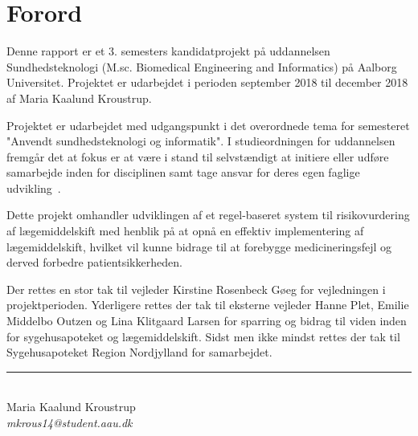 \chapter*{Forord}
Denne rapport er et 3. semesters kandidatprojekt på uddannelsen Sundhedsteknologi (M.sc. Biomedical Engineering and Informatics) på Aalborg Universitet. Projektet er udarbejdet i perioden september 2018 til december 2018 af Maria Kaalund Kroustrup. 

Projektet er udarbejdet med udgangspunkt i det overordnede tema for semesteret "Anvendt sundhedsteknologi og informatik". I studieordningen for uddannelsen fremgår det at fokus er at være i stand til selvstændigt at initiere eller udføre samarbejde inden for disciplinen samt tage ansvar for deres egen faglige udvikling~\citep{Studieordning2011}. 

Dette projekt omhandler udviklingen af et regel-baseret system til risikovurdering af lægemiddelskift med henblik på at opnå en effektiv implementering af lægemiddelskift, hvilket vil kunne bidrage til at forebygge medicineringsfejl og derved forbedre patientsikkerheden. 

Der rettes en stor tak til vejleder Kirstine Rosenbeck Gøeg for vejledningen i projektperioden. Yderligere rettes der tak til eksterne vejleder Hanne Plet, Emilie Middelbo Outzen og Lina Klitgaard Larsen for sparring og bidrag til viden inden for sygehusapoteket og lægemiddelskift. Sidst men ikke mindst rettes der tak til Sygehusapoteket Region Nordjylland for samarbejdet. 

\vspace{1.5cm}
\begin{center}
\rule{6cm}{0.4pt} \\
Maria Kaalund Kroustrup \\
\textit{mkrous14@student.aau.dk}
\end{center}
